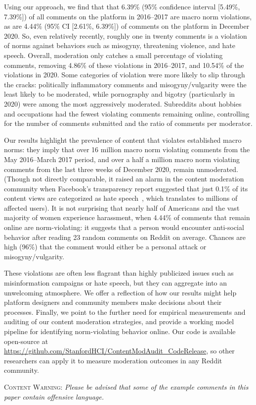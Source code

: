 Using our approach, we find that that 6.39\% (95\% confidence interval [5.49\%, 7.39\%]) of all comments on the platform in 2016--2017 are macro norm violations, as are 4.44\% (95\% CI [2.61\%, 6.39\%]) of comments on the platform in December 2020. So, even relatively recently, roughly one in twenty comments is a violation of norms against behaviors such as misogyny, threatening violence, and hate speech. Overall, moderation only catches a small percentage of violating comments, removing 4.86\% of these violations in 2016--2017, and 10.54\% of the violations in 2020. Some categories of violation were more likely to slip through the cracks: politically inflammatory comments and misogyny/vulgarity were the least likely to be moderated, while pornography and bigotry (particularly in 2020) were among the most aggressively moderated. Subreddits about hobbies and occupations had the fewest violating comments remaining online, controlling for the number of comments submitted and the ratio of comments per moderator.

Our results highlight the prevalence of content that violates established macro norms: they imply that over 16 million macro norm violating comments from the May 2016--March 2017 period, and over a half a million macro norm violating comments from the last three weeks of December 2020, remain unmoderated. (Though not directly comparable, it raised an alarm in the content moderation community when Facebook's transparency report suggested that just 0.1\% of its content views are categorized as hate speech~\cite{58_Culliford}, which translates to millions of affected users). 
It is not surprising that nearly half of Americans and the vast majority of women experience harassment, when 4.44\% of comments that remain online are norm-violating: it suggests that a person would encounter anti-social behavior after reading 23 random comments on Reddit on average. Chances are high (96\%) that the comment would either be a personal attack or misogyny/vulgarity.

These violations are often less flagrant than highly publicized issues such as misinformation campaigns or hate speech, but they can aggregate into an unwelcoming atmosphere.
We offer a reflection of how our results might help platform designers and community members make decisions about their processes. 
Finally, we point to the further need for empirical measurements and auditing of our content moderation strategies, and provide a working model pipeline for identifying norm-violating behavior online. Our code is available open-source at \url{https://github.com/StanfordHCI/ContentModAudit_CodeRelease}, so other researchers can apply it to measure moderation outcomes in any Reddit community.

\medskip

\textsc{Content Warning: } {\it Please be advised that some of the example comments in this paper contain offensive language.}  


